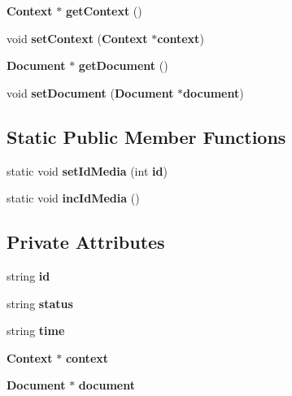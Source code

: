 \begin{CompactItemize}
\item 
{\bf Context} $\ast$ \textbf{getContext} ()\label{classbr_1_1ufscar_1_1lince_1_1ginga_1_1recommender_1_1Media_55db892dd93d80828064fc266e953172}

\item 
void \textbf{setContext} ({\bf Context} $\ast${\bf context})\label{classbr_1_1ufscar_1_1lince_1_1ginga_1_1recommender_1_1Media_0ca636f9ea054270a55bb577d2c939c4}

\item 
{\bf Document} $\ast$ \textbf{getDocument} ()\label{classbr_1_1ufscar_1_1lince_1_1ginga_1_1recommender_1_1Media_3f65f50a478ba7b5b81d819b16b5f01c}

\item 
void \textbf{setDocument} ({\bf Document} $\ast${\bf document})\label{classbr_1_1ufscar_1_1lince_1_1ginga_1_1recommender_1_1Media_406b1aca372659ab6eab4b0182c98a45}

\end{CompactItemize}
\subsection*{Static Public Member Functions}
\begin{CompactItemize}
\item 
static void \textbf{setIdMedia} (int {\bf id})\label{classbr_1_1ufscar_1_1lince_1_1ginga_1_1recommender_1_1Media_b98d9f57e50809c8a53277a1ad0d14c1}

\item 
static void \textbf{incIdMedia} ()\label{classbr_1_1ufscar_1_1lince_1_1ginga_1_1recommender_1_1Media_acbfc4f204e7ba2de949b63601ca6e25}

\end{CompactItemize}
\subsection*{Private Attributes}
\begin{CompactItemize}
\item 
string {\bf id}\label{classbr_1_1ufscar_1_1lince_1_1ginga_1_1recommender_1_1Media_d97b05b88ce9080f35b157cfacc8eb69}

\item 
string {\bf status}\label{classbr_1_1ufscar_1_1lince_1_1ginga_1_1recommender_1_1Media_b4d38e7365d935f2a5f1403eec29127e}

\item 
string {\bf time}\label{classbr_1_1ufscar_1_1lince_1_1ginga_1_1recommender_1_1Media_f4ef0c9955005c3fe914b2c039d70dbf}

\item 
{\bf Context} $\ast$ {\bf context}\label{classbr_1_1ufscar_1_1lince_1_1ginga_1_1recommender_1_1Media_a254a98e2e3d77626823cad539eced2b}

\item 
{\bf Document} $\ast$ {\bf document}\label{classbr_1_1ufscar_1_1lince_1_1ginga_1_1recommender_1_1Media_a25c3b1ddc44ed56c59d5c70879ec5f4}

\end{CompactItemize}
